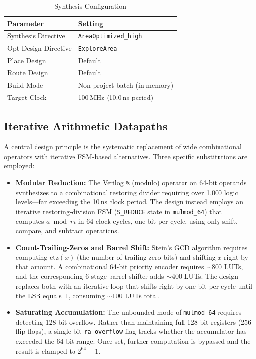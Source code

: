 \documentclass[lettersize,journal]{IEEEtran}
\begin{document}
\begin{table}[!t]
\caption{Synthesis Configuration\label{tab:synthconfig}}
\centering
\begin{tabular}{@{}ll@{}}
\toprule
\textbf{Parameter} & \textbf{Setting} \\
\midrule
Synthesis Directive  & \texttt{AreaOptimized\_high} \\
Opt Design Directive & \texttt{ExploreArea} \\
Place Design         & Default \\
Route Design         & Default \\
Build Mode           & Non-project batch (in-memory) \\
Target Clock         & 100\,MHz (10.0\,ns period) \\
\bottomrule
\end{tabular}
\end{table}

\subsection{Iterative Arithmetic Datapaths}

A central design principle is the systematic replacement of wide combinational operators with iterative FSM-based alternatives. Three specific substitutions are employed:

\begin{itemize}
\item \textbf{Modular Reduction:} The Verilog \texttt{\%} (modulo) operator on 64-bit operands synthesizes to a combinational restoring divider requiring over 1{,}000 logic levels---far exceeding the 10\,ns clock period. The design instead employs an iterative restoring-division FSM (\texttt{S\_REDUCE} state in \texttt{mulmod\_64}) that computes $a \bmod m$ in 64 clock cycles, one bit per cycle, using only shift, compare, and subtract operations.

\item \textbf{Count-Trailing-Zeros and Barrel Shift:} Stein's GCD algorithm requires computing $\text{ctz}(x)$ (the number of trailing zero bits) and shifting $x$ right by that amount. A combinational 64-bit priority encoder requires $\sim$800 LUTs, and the corresponding 6-stage barrel shifter adds $\sim$400 LUTs. The design replaces both with an iterative loop that shifts right by one bit per cycle until the LSB equals~1, consuming $\sim$100 LUTs total.

\item \textbf{Saturating Accumulation:} The unbounded mode of \texttt{mulmod\_64} requires detecting 128-bit overflow. Rather than maintaining full 128-bit registers (256 flip-flops), a single-bit \texttt{ra\_overflow} flag tracks whether the accumulator has exceeded the 64-bit range. Once set, further computation is bypassed and the result is clamped to $2^{64} - 1$.
\end{itemize}
\end{document}
